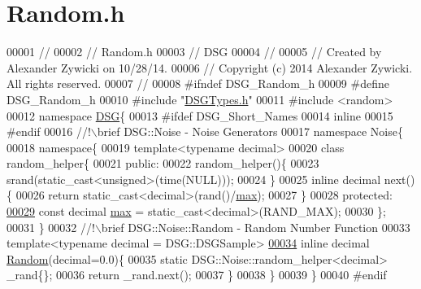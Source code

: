 \hypertarget{_random_8h_source}{\section{Random.\+h}
\label{_random_8h_source}
}

\begin{DoxyCode}
00001 \textcolor{comment}{//}
00002 \textcolor{comment}{//  Random.h}
00003 \textcolor{comment}{//  DSG}
00004 \textcolor{comment}{//}
00005 \textcolor{comment}{//  Created by Alexander Zywicki on 10/28/14.}
00006 \textcolor{comment}{//  Copyright (c) 2014 Alexander Zywicki. All rights reserved.}
00007 \textcolor{comment}{//}
00008 \textcolor{preprocessor}{#ifndef DSG\_Random\_h}
00009 \textcolor{preprocessor}{#define DSG\_Random\_h}
00010 \textcolor{preprocessor}{#include "\hyperlink{_d_s_g_types_8h}{DSGTypes.h}"}
00011 \textcolor{preprocessor}{#include <random>}
00012 \textcolor{keyword}{namespace }\hyperlink{namespace_d_s_g}{DSG}\{
00013 \textcolor{preprocessor}{#ifdef DSG\_Short\_Names}
00014     \textcolor{keyword}{inline}
00015 \textcolor{preprocessor}{#endif}
00016 \textcolor{comment}{    //!\(\backslash\)brief DSG::Noise - Noise Generators}
00017 \textcolor{comment}{}    \textcolor{keyword}{namespace }Noise\{
00018         \textcolor{keyword}{namespace}\{
00019             \textcolor{keyword}{template}<\textcolor{keyword}{typename} decimal>
00020             \textcolor{keyword}{class }random\_helper\{
00021             \textcolor{keyword}{public}:
00022                 random\_helper()\{
00023                     srand(static\_cast<unsigned>(time(NULL)));
00024                 \}
00025                 \textcolor{keyword}{inline} decimal next()\{
00026                     \textcolor{keywordflow}{return} \textcolor{keyword}{static\_cast<}decimal\textcolor{keyword}{>}(rand()/\hyperlink{_random_8h_adf0c2e3aed2e917753f8cca4522e205e}{max});
00027                 \}
00028             \textcolor{keyword}{protected}:
\hypertarget{_random_8h_source_l00029}{}\hyperlink{_random_8h_adf0c2e3aed2e917753f8cca4522e205e}{00029}                 \textcolor{keyword}{const} decimal \hyperlink{_random_8h_adf0c2e3aed2e917753f8cca4522e205e}{max} = \textcolor{keyword}{static\_cast<}decimal\textcolor{keyword}{>}(RAND\_MAX);
00030             \};
00031         \}\textcolor{comment}{}
00032 \textcolor{comment}{        //!\(\backslash\)brief DSG::Noise::Random - Random Number Function}
00033 \textcolor{comment}{}        \textcolor{keyword}{template}<\textcolor{keyword}{typename} decimal = DSG::DSGSample>
\hypertarget{_random_8h_source_l00034}{}\hyperlink{namespace_d_s_g_1_1_noise_af210d83913fada9e9474410caff25bc1}{00034}         \textcolor{keyword}{inline} decimal \hyperlink{namespace_d_s_g_1_1_noise_af210d83913fada9e9474410caff25bc1}{Random}(decimal=0.0)\{
00035             \textcolor{keyword}{static} DSG::Noise::random\_helper<decimal> \_rand\{\};
00036             \textcolor{keywordflow}{return} \_rand.next();
00037         \}
00038     \}
00039 \}
00040 \textcolor{preprocessor}{#endif}
\end{DoxyCode}
